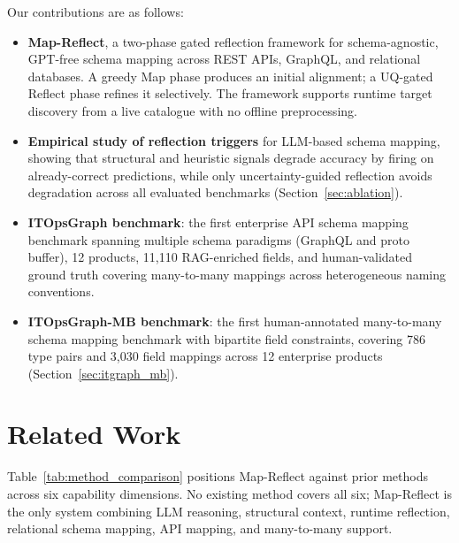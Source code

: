 \documentclass[sigconf, nonacm]{acmart}
\begin{document}
Our contributions are as follows:
\begin{itemize}[noitemsep,topsep=2pt,leftmargin=*]
  \item \textbf{Map-Reflect}, a two-phase gated reflection framework for schema-agnostic, GPT-free schema mapping across REST APIs, GraphQL, and relational databases. A greedy Map phase produces an initial alignment; a UQ-gated Reflect phase refines it selectively. The framework supports runtime target discovery from a live catalogue with no offline preprocessing.
  \item \textbf{Empirical study of reflection triggers} for LLM-based schema mapping, showing that structural and heuristic signals degrade accuracy by firing on already-correct predictions, while only uncertainty-guided reflection avoids degradation across all evaluated benchmarks (Section~\ref{sec:ablation}).
  \item \textbf{ITOpsGraph benchmark}: the first enterprise API schema mapping benchmark spanning multiple schema paradigms (GraphQL and proto buffer), 12 products, 11,110 RAG-enriched fields, and human-validated ground truth covering many-to-many mappings across heterogeneous naming conventions.
  \item \textbf{ITOpsGraph-MB benchmark}: the first human-annotated many-to-many schema mapping benchmark with bipartite field constraints, covering 786 type pairs and 3,030 field mappings across 12 enterprise products (Section~\ref{sec:itgraph_mb}).
\end{itemize}


\section{Related Work}

Table~\ref{tab:method_comparison} positions Map-Reflect against prior methods across six capability dimensions. No existing method covers all six; Map-Reflect is the only system combining LLM reasoning, structural context, runtime reflection, relational schema mapping, API mapping, and many-to-many support.
\end{document}
